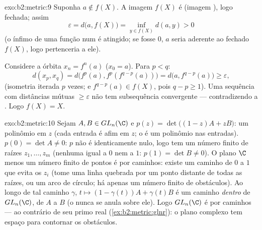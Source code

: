 \begin{solution}{exo:b2:metric:9}
Suponha $a \notin f(X)$. A imagem $f(X)$ é  (imagem
), logo fechada; assim
\[
\varepsilon = d\bigl(a, f(X)\bigr)
= \inf_{y \in f(X)} d(a, y) > 0
\]
(o ínfimo de uma função  num  é atingido;
se fosse $0$, $a$ seria aderente ao fechado $f(X)$, logo pertenceria a
ele).

Considere a órbita $x_n = f^n(a)$ ($x_0 = a$). Para $p < q$:
\[
d(x_p, x_q) = d\bigl(f^p(a), f^p(f^{q-p}(a))\bigr)
= d\bigl(a, f^{q-p}(a)\bigr) \geq \varepsilon,
\]
(isometria iterada $p$ vezes; e $f^{q-p}(a) \in f(X)$, pois $q - p
\geq 1$). Uma sequência com distâncias mútuas $\geq \varepsilon$ não tem
subsequência convergente --- contradizendo a . Logo $f(X) =
X$.
\end{solution}

\begin{solution}{exo:b2:metric:10}
Sejam $A, B \in GL_n(\C)$ e $p(z) = \det\bigl((1-z)A + zB\bigr)$: um
polinômio em $z$ (cada entrada é afim em $z$; o  é um
polinômio nas entradas). $p(0) = \det A \neq 0$: $p$ não é
identicamente nulo, logo tem um número finito de raízes $z_1, \dots, z_m$
(nenhuma igual a $0$ nem a $1$: $p(1) = \det B \neq 0$). O plano $\C$
menos um número finito de pontos é  por caminhos: existe um caminho de $0$ a $1$
que evita os $z_i$ (tome uma linha quebrada por um ponto distante
de todas as raízes, ou um arco de círculo; há apenas um número finito de obstáculos).
Ao longo de tal caminho $\gamma$, $t \mapsto (1 - \gamma(t))A +
\gamma(t)B$ é um caminho  \emph{dentro} de $GL_n(\C)$, de $A$
a $B$ (o  nunca se anula sobre ele). Logo $GL_n(\C)$ é
 por caminhos --- ao contrário de seu primo real
(\cref{ex:b2:metric:glnr}): o plano complexo tem espaço para contornar
os obstáculos.
\end{solution}

